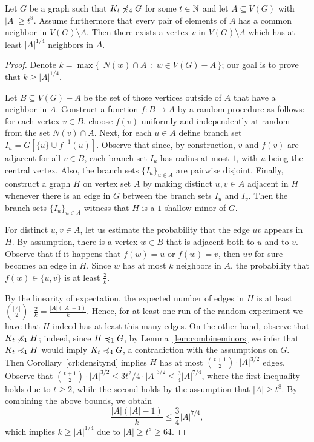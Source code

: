 \begin{lemma}\label{lem:diversity}
  Let $G$ be a graph such that $K_t\not\preccurlyeq_4G$ for some
  $t\in\mathbb{N}$ and let $A\subseteq V(G)$ with $|A|\geq t^{8}$. 
  Assume furthermore that every pair of elements of $A$ has a common neighbor in $V(G)\setminus A$.
  Then there exists a vertex $v$ in $V(G)\setminus A$ which has at least $|A|^{1/4}$ neighbors in $A$.
\end{lemma}
\begin{proof}
Denote $k=\max\{\,|N(w)\cap A|\ \colon\ w\in V(G)-A\,\}$; our goal is to prove that $k\geq |A|^{1/4}$.

Let $B\subseteq V(G)-A$ be the set of those vertices outside of $A$ that have a  neighbor in $A$. 
Construct a function $f\colon B\to A$ by a random procedure as follows:
for each vertex $v\in B$, choose $f(v)$ uniformly and independently at random from the set $N(v)\cap A$.
Next, for each $u\in A$ define branch set $I_u=G[\{u\}\cup f^{-1}(u)]$. Observe that since, by construction, $v$ and $f(v)$ are adjacent for all $v\in B$, each branch set $I_u$ has radius at most $1$,
with $u$ being the central vertex. Also, the branch sets $\{I_u\}_{u\in A}$ are pairwise disjoint.
Finally, construct a graph $H$ on vertex set $A$ by making distinct $u,v\in A$ adjacent in $H$ whenever there is an edge in $G$ between the branch sets $I_u$ and $I_v$.
Then the branch sets $\{I_u\}_{u\in A}$ witness that $H$ is a $1$-shallow minor of $G$.

For distinct $u,v\in A$, let us estimate the probability that the edge $uv$ appears in $H$.
By assumption, there is a vertex $w\in B$ that is adjacent both to $u$ and to $v$. Observe that if it happens that $f(w)=u$ or $f(w)=v$, then $uv$ for sure becomes an edge in $H$. 
Since $w$ has at most $k$ neighbors in $A$, the probability that $f(w)\in \{u,v\}$ is at least $\frac{2}{k}$.

By the linearity of expectation, the expected number of edges in $H$ is at least $\binom{|A|}{2}\cdot \frac{2}{k}=\frac{|A|(|A|-1)}{k}$.
Hence, for at least one run of the random experiment we have that $H$ indeed has at least this many edges. 
On the other hand, observe that $K_t\not\preccurlyeq_1 H$; indeed, since $H\preccurlyeq_1 G$, by Lemma~\ref{lem:combineminors} we infer that $K_t\preccurlyeq_1 H$ would imply $K_t\preccurlyeq_4 G$, a contradiction with the assumptions on $G$.
Then Corollary~\ref{crl:densitynd} implies $H$ has at most $\binom{t+1}{2}\cdot |A|^{3/2}$ edges.
Observe that 
$\binom{t+1}{2}\cdot |A|^{3/2}\leq 3t^2/4\cdot |A|^{3/2}\leq \frac{3}{4}|A|^{7/4}$,
where the first inequality holds due to $t\geq 2$, while the second holds by the assumption that $|A|\geq t^8$.
By combining the above bounds, we obtain
$$\frac{|A|(|A|-1)}{k}\leq \frac{3}{4}|A|^{7/4},$$
which implies $k\geq |A|^{1/4}$ due to $|A|\geq t^8\geq 64$.
\end{proof}

